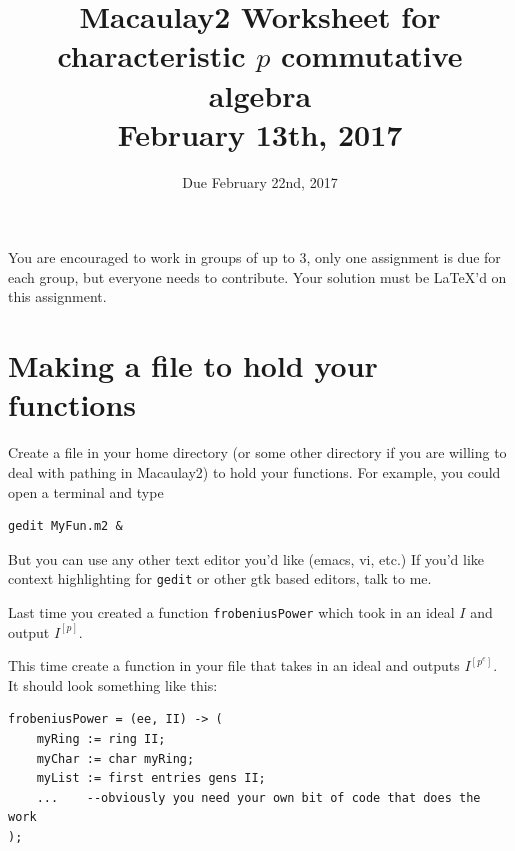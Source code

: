 \documentclass[12pt]{amsart}
\numberwithin{equation}{theorem}
\renewcommand{\:}{\colon}
\begin{document}
\title[M2 Worksheet]{Macaulay2 Worksheet for characteristic $p$ commutative algebra\\February 13th, 2017}
\author{Due February 22nd, 2017}



\maketitle

%
%

You are encouraged to work in groups of up to 3, only one assignment is due for each group, but everyone needs to contribute.  Your solution must be LaTeX'd on this assignment.

\section{Making a file to hold your functions}

Create a file in your home directory (or some other directory if you are willing to deal with pathing in Macaulay2) to hold your functions.  For example, you could open a terminal and type
\begin{verbatim}
gedit MyFun.m2 &
\end{verbatim}
But you can use any other text editor you'd like (emacs, vi, etc.)  If you'd like context highlighting for {\tt gedit} or other gtk based editors, talk to me.

Last time you created a function {\tt frobeniusPower} which took in an ideal $I$ and output $I^{[p]}$.
\begin{exercise}
This time create a function in your file that takes in an ideal and outputs $I^{[p^e]}$.  It should look something like this:
\begin{verbatim}
frobeniusPower = (ee, II) -> (
    myRing := ring II;
    myChar := char myRing;
    myList := first entries gens II;
    ...    --obviously you need your own bit of code that does the work
);
\end{verbatim}
\end{exercise}
\end{document}
